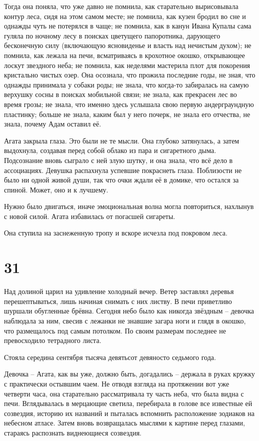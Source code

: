 \documentclass[
  a5paperpaper,
  DIV=11,
  numbers=noendperiod]{scrreprt}
\begin{document}
Тогда она поняла, что уже давно не помнила, как старательно вырисовывала
контур леса, сидя на этом самом месте; не помнила, как кузен бродил во
сне и однажды чуть не потерялся в чаще; не помнила, как в канун Ивана
Купалы сама гуляла по ночному лесу в поисках цветущего папоротника,
дарующего бесконечную силу (включающую ясновиденье и власть над нечистым
духом); не помнила, как лежала на печи, всматриваясь в крохотное окошко,
открывающее лоскут звездного неба; не помнила, как неделями мастерила
плот для покорения кристально чистых озер. Она осознала, что прожила
последние годы, не зная, что однажды принимала у собаки роды; не знала,
что когда-то забиралась на самую верхушку сосны в поисках мобильной
связи; не знала, как прекрасен лес во время грозы; не знала, что именно
здесь услышала свою первую андерграундную пластинку; больше не знала,
каким был у него почерк, не знала его отчества, не знала, почему Адам
оставил её.

Агата закрыла глаза. Это были не те мысли. Она глубоко затянулась, а
затем выдохнула, создавая перед собой облако из пара и сигаретного дыма.
Подсознание вновь сыграло с ней злую шутку, и она знала, что всё дело в
ассоциациях. Девушка распахнула успевшие покраснеть глаза. Поблизости не
было ни одной живой души, так что очки ждали её в домике, что остался за
спиной. Может, оно и к лучшему.

Нужно было двигаться, иначе эмоциональная волна могла повториться,
нахлынув с новой силой. Агата избавилась от погасшей сигареты.

Она ступила на заснеженную тропу и вскоре исчезла под покровом леса.

\section*{31}\label{31}


Над долиной царил на удивление холодный вечер. Ветер заставлял деревья
перешептываться, лишь начиная снимать с них листву. В печи приветливо
шуршали обугленные брёвна. Сегодня небо было как никогда звёздным --
девочка наблюдала за ним, свесив с лежанки не знавшие загара ноги и
глядя в окошко, что размещалось под самым потолком. По своим размерам
последнее не превосходило тетрадного листа.

Стояла середина сентября тысяча девятьсот девяносто седьмого года.

Девочка -- Агата, как вы уже, должно быть, догадались -- держала в руках
кружку с практически остывшим чаем. Не отводя взгляда на протяжении вот
уже четверти часа, она старательно рассматривала ту часть неба, что была
видна с печи. Вглядывалась в мерцающие светила, перебирала в голове все
известные ей созвездия, историю их названий и пыталась вспомнить
расположение зодиаков на небесном атласе. Затем вновь возвращалась
мыслями к картине перед глазами, стараясь распознать виднеющиеся
созвездия.
\end{document}
